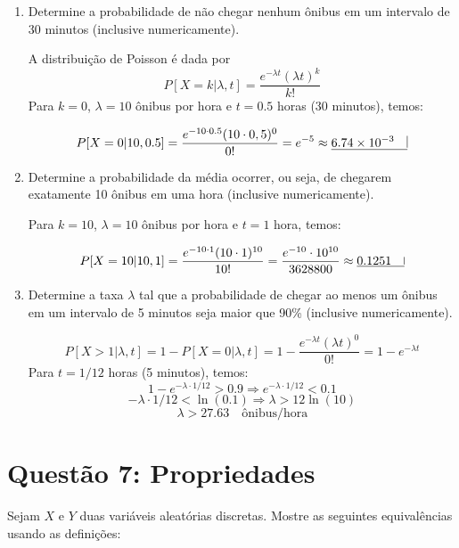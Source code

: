\documentclass[12 pt]{article}
\begin{document}
\begin{enumerate}
    \item Determine a probabilidade de não chegar nenhum ônibus em um intervalo de 30 minutos (inclusive numericamente).
    \begin{tcolorbox}[colframe=black, title=Resposta:]
        A distribuição de Poisson é dada por $$ P[X = k | \lambda, t] = \frac{e^{-\lambda t}(\lambda t)^k}{k!}$$
        Para $k=0$, $\lambda = 10$ ônibus por hora e $t = 0.5$ horas (30 minutos), temos: 

        $$P[X = 0 | 10, 0.5] = \frac{e^{-10 \cdot 0.5}(10 \cdot 0,5)^0}{0!} = e^{-5} \approx \underline{6.74 \times 10^{-3} \quad \vline}$$
    \end{tcolorbox}
    \item Determine a probabilidade da média ocorrer, ou seja, de chegarem exatamente 10 ônibus em uma hora (inclusive numericamente).
    \begin{tcolorbox}[colframe=black, title=Resposta:]
        Para $k=10$, $\lambda = 10$ ônibus por hora e $t = 1$ hora, temos: 

        $$ P[X = 10 | 10, 1] = \frac{e^{-10 \cdot 1}(10 \cdot 1)^{10}}{10!} = \frac{e^{-10} \cdot 10^{10}}{3628800} \approx \underline{0.1251 \quad \vline}$$
    

    \end{tcolorbox}
    \item Determine a taxa $\lambda$ tal que a probabilidade de chegar ao menos um ônibus em um intervalo de 5
          minutos seja maior que 90\% (inclusive numericamente).
          \begin{tcolorbox}[colframe=black, title=Resposta:]
            $$P[X>1 | \lambda, t] = 1 - P[X=0 | \lambda, t] = 1 - \frac{e^{-\lambda t}(\lambda t)^0}{0!} = 1 - e^{-\lambda t}$$
            Para $t = 1/12$ horas (5 minutos), temos:
            $$1 - e^{-\lambda \cdot 1/12} > 0.9 \Rightarrow e^{-\lambda \cdot 1/12} < 0.1 $$
            $$-\lambda \cdot 1/12 < \ln(0.1) \Rightarrow \lambda > 12 \ln(10) $$
            $$\boxed{\lambda > 27.63 \quad \text{ônibus/hora}}$$

          \end{tcolorbox}
\end{enumerate}

\section*{Questão 7: Propriedades}
Sejam $X$ e $Y$ duas variáveis aleatórias discretas. Mostre as seguintes equivalências usando as definições:
\end{document}
